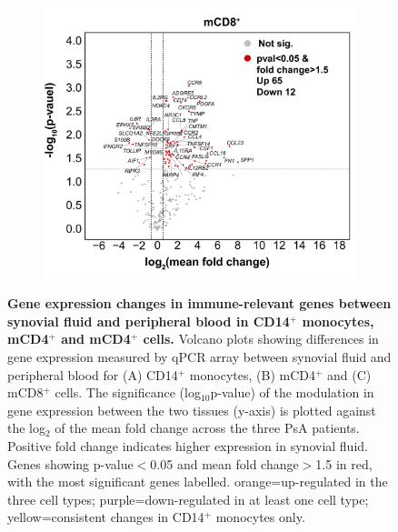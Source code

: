 \begin{figure}[htbp]
\begin{subfigure}{0.48\textwidth}
\caption{\textbf{}}
\end{subfigure}
\begin{subfigure}{0.48\textwidth}
\centering
\includegraphics[width=\textwidth]{./Results3/pdfs/PSA_CD8_vulcano_plot_PCR_array_mean_FC}
\caption{\textbf{}}
\end{subfigure}
\caption[Gene expression changes in immune-relevant genes between synovial fluid and peripheral blood in CD14$^+$ monocytes, mCD4$^+$ and mCD8$^+$ cells.]{\textbf{Gene expression changes in immune-relevant genes between synovial fluid and peripheral blood in CD14$^+$ monocytes, mCD4$^+$ and mCD4$^+$ cells.} Volcano plots showing differences in gene expression measured by qPCR array between synovial fluid and peripheral blood for (A) CD14$^+$ monocytes, (B) mCD4$^+$ and (C) mCD8$^+$ cells. The significance (log$_{10}$p-value) of the modulation in gene expression between the two tissues (y-axis) is plotted against the log${_2}$ of the mean fold change across the three PsA patients. Positive fold change indicates higher expression in synovial fluid. Genes showing p-value$<$0.05 and mean fold change$>$1.5 in red, with the most significant genes labelled. orange=up-regulated in the three cell types; purple=down-regulated in at least one cell type; yellow=consistent changes in CD14$^+$ monocytes only.}
\label{figure:PSA_PCR_array_vulcano_plots}
\end{figure} 



